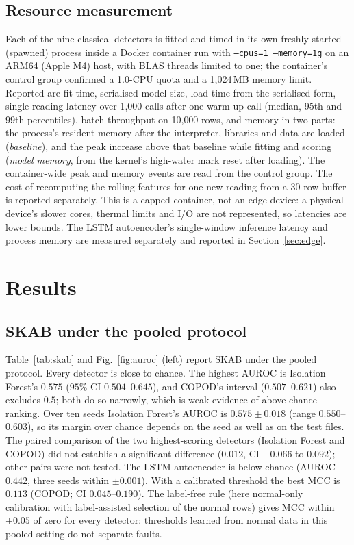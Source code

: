 \documentclass[11pt]{article}
\begin{document}
\subsection{Resource measurement}
Each of the nine classical detectors is fitted and timed in its own freshly started (spawned) process
inside a Docker container run with \texttt{--cpus=1 --memory=1g} on an ARM64
(Apple M4) host, with BLAS threads limited to one; the container's control group
confirmed a 1.0-CPU quota and a 1{,}024\,MB memory limit. Reported are fit time,
serialised model size, load time from the serialised form, single-reading latency
over 1{,}000 calls after one warm-up call (median, 95th and 99th percentiles), batch
throughput on 10{,}000 rows, and memory in two parts: the process's resident memory
after the interpreter, libraries and data are loaded (\emph{baseline}), and the peak
increase above that baseline while fitting and scoring (\emph{model memory}, from
the kernel's high-water mark reset after loading). The container-wide peak and
memory events are read from the control group.
The cost of recomputing the rolling features for one new reading from a
30-row buffer is reported separately. This is a capped container, not an edge
device: a physical device's slower cores, thermal limits and I/O are not
represented, so latencies are lower bounds. The LSTM autoencoder's single-window
inference latency and process memory are measured separately and reported in
Section~\ref{sec:edge}.

\section{Results}
\label{sec:results}

\subsection{SKAB under the pooled protocol}
Table~\ref{tab:skab} and Fig.~\ref{fig:auroc} (left) report SKAB under the pooled
protocol. Every detector is close to chance. The highest AUROC is Isolation
Forest's $0.575$ ($95\%$ CI $0.504$--$0.645$), and COPOD's interval ($0.507$--$0.621$)
also excludes $0.5$; both do so narrowly, which is weak evidence of above-chance ranking.
Over ten seeds Isolation Forest's AUROC is $0.575\pm0.018$ (range $0.550$--$0.603$), so
its margin over chance depends on the seed as well as on the test files. The paired
comparison of the two highest-scoring detectors (Isolation Forest and COPOD) did not
establish a significant difference ($0.012$, CI $-0.066$ to $0.092$); other pairs were not
tested. The LSTM autoencoder is below chance
(AUROC $0.442$, three seeds within $\pm0.001$). With a calibrated threshold the
best MCC is $0.113$ (COPOD; CI $0.045$--$0.190$). The label-free rule (here normal-only
calibration with label-assisted selection of the normal rows) gives MCC
within $\pm0.05$ of zero for every detector: thresholds learned from normal
data in this pooled setting do not separate faults.
\end{document}
